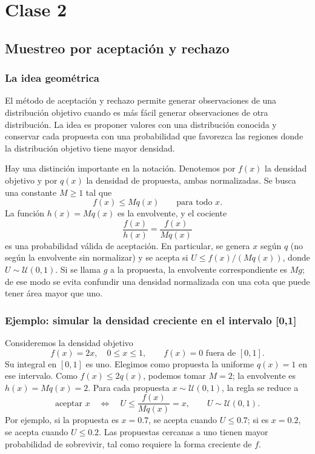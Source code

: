 \section{Clase 2}
\subsection{Muestreo por aceptación y rechazo}

\subsubsection{La idea geométrica}

El método de aceptación y rechazo permite generar observaciones de una
distribución objetivo cuando es más fácil generar observaciones de otra
distribución. La idea es proponer valores con una distribución conocida y
conservar cada propuesta con una probabilidad que favorezca las regiones donde
la distribución objetivo tiene mayor densidad.

Hay una distinción importante en la notación. Denotemos por $f(x)$ la densidad
objetivo y por $q(x)$ la densidad de propuesta, ambas normalizadas. Se busca una
constante $M\geq 1$ tal que
\[
    f(x)\leq Mq(x)\qquad\text{para todo }x.
\]
La función $h(x)=Mq(x)$ es la envolvente, y el cociente
\[
    \frac{f(x)}{h(x)}=\frac{f(x)}{Mq(x)}
\]
es una probabilidad válida de aceptación. En particular, se genera $x$ según
$q$ (no según la envolvente sin normalizar) y se acepta si
$U\leq f(x)/(Mq(x))$, donde $U\sim\mathcal{U}(0,1)$. Si se llama $g$ a la
propuesta, la envolvente correspondiente es $Mg$; de ese modo se evita
confundir una densidad normalizada con una cota que puede tener área mayor que
uno.

\subsubsection{Ejemplo: simular la densidad creciente en el intervalo [0,1]}

Consideremos la densidad objetivo
\[
    f(x)=2x,\quad 0\leq x\leq 1,
    \qquad f(x)=0\text{ fuera de }[0,1].
\]
Su integral en $[0,1]$ es uno. Elegimos como propuesta la uniforme
$q(x)=1$ en ese intervalo. Como $f(x)\leq 2q(x)$, podemos tomar $M=2$; la
envolvente es $h(x)=Mq(x)=2$. Para cada propuesta $x\sim\mathcal{U}(0,1)$, la
regla se reduce a
\[
    \text{aceptar }x\quad\Longleftrightarrow\quad
    U\leq\frac{f(x)}{Mq(x)}=x,
    \qquad U\sim\mathcal{U}(0,1).
\]
Por ejemplo, si la propuesta es $x=0.7$, se acepta cuando $U\leq0.7$; si es
$x=0.2$, se acepta cuando $U\leq0.2$. Las propuestas cercanas a uno tienen
mayor probabilidad de sobrevivir, tal como requiere la forma creciente de
$f$.

